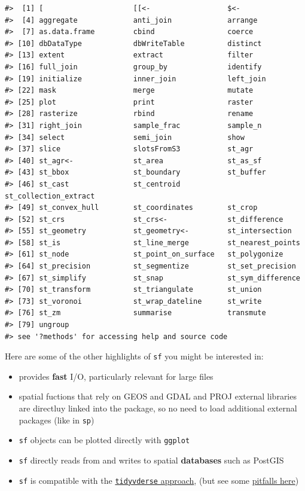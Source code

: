 \documentclass[]{book}
\begin{document}
\begin{verbatim}
#>  [1] [                     [[<-                  $<-                  
#>  [4] aggregate             anti_join             arrange              
#>  [7] as.data.frame         cbind                 coerce               
#> [10] dbDataType            dbWriteTable          distinct             
#> [13] extent                extract               filter               
#> [16] full_join             group_by              identify             
#> [19] initialize            inner_join            left_join            
#> [22] mask                  merge                 mutate               
#> [25] plot                  print                 raster               
#> [28] rasterize             rbind                 rename               
#> [31] right_join            sample_frac           sample_n             
#> [34] select                semi_join             show                 
#> [37] slice                 slotsFromS3           st_agr               
#> [40] st_agr<-              st_area               st_as_sf             
#> [43] st_bbox               st_boundary           st_buffer            
#> [46] st_cast               st_centroid           st_collection_extract
#> [49] st_convex_hull        st_coordinates        st_crop              
#> [52] st_crs                st_crs<-              st_difference        
#> [55] st_geometry           st_geometry<-         st_intersection      
#> [58] st_is                 st_line_merge         st_nearest_points    
#> [61] st_node               st_point_on_surface   st_polygonize        
#> [64] st_precision          st_segmentize         st_set_precision     
#> [67] st_simplify           st_snap               st_sym_difference    
#> [70] st_transform          st_triangulate        st_union             
#> [73] st_voronoi            st_wrap_dateline      st_write             
#> [76] st_zm                 summarise             transmute            
#> [79] ungroup              
#> see '?methods' for accessing help and source code
\end{verbatim}

Here are some of the other highlights of \texttt{sf} you might be
interested in:

\begin{itemize}
\item
  provides \textbf{fast} I/O, particularly relevant for large files
\item
  spatial fuctions that rely on GEOS and GDAL and PROJ external
  libraries are directluy linked into the package, so no need to load
  additional external packages (like in \texttt{sp})\\
\item
  \texttt{sf} objects can be plotted directly with \texttt{ggplot}
\item
  \texttt{sf} directly reads from and writes to spatial
  \textbf{databases} such as PostGIS
\item
  \texttt{sf} is compatible with the
  \href{https://www.tidyverse.org/}{\texttt{tidyvderse} approach}, (but
  see some
  \href{https://geocompr.github.io/geocompkg/articles/tidyverse-pitfalls.html}{pitfalls
  here})
\end{itemize}
\end{document}
